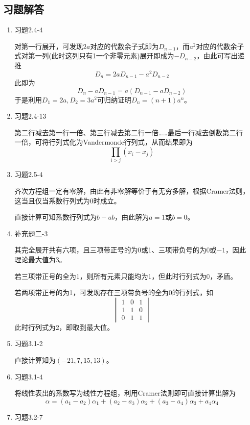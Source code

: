 \documentclass[a4paper,UTF8,fontset=windows]{ctexart}
\begin{document}
\subsection{习题解答}
\begin{enumerate}
    \item 习题2.4-4
    
    对第一行展开，可发现$2a$对应的代数余子式即为$D_{n-1}$，而$a^2$对应的代数余子式对第一列(此时这列只有1一个非零元素)展开即成为$-D_{n-2}$，由此可写出递推
    $$D_n=2aD_{n-1}-a^2D_{n-2}$$
    此即为
    $$D_n-aD_{n-1}=a(D_{n-1}-aD_{n-2})$$
    于是利用$D_1=2a,D_2=3a^2$可归纳证明$D_n=(n+1)a^n$。

    \item 习题2.4-13
    
    第二行减去第一行一倍、第三行减去第二行一倍……最后一行减去倒数第二行一倍，可将行列式化为Vandermonde行列式，从而结果即为
    $$\prod_{i>j}(x_i-x_j)$$

    \item 习题2.5-4
    
    齐次方程组一定有零解，由此有非零解等价于有无穷多解，根据Cramer法则，这当且仅当系数行列式为0时成立。

    直接计算可知系数行列式为$b-ab$，由此解为$a=1$或$b=0$。

    \item 补充题二-3
    
    其完全展开共有六项，且三项带正号的为0或1、三项带负号的为0或$-1$，因此理论最大值为3。

    若三项带正号的全为1，则所有元素只能均为1，但此时行列式为0，矛盾。

    若两项带正号的为1，可发现存在三项带负号的全为0的行列式，如
    $$\begin{vmatrix}1&0&1\\1&1&0\\0&1&1\end{vmatrix}$$
    此时行列式为2，即取到最大值。


    \item 习题3.1-2
    
    直接计算知为$(-21,7,15,13)$。

    \item 习题3.1-4
    
    将线性表出的系数写为线性方程组，利用Cramer法则即可直接计算出解为
    $$\alpha=(a_1-a_2)\alpha_1+(a_2-a_3)\alpha_2+(a_3-a_4)\alpha_3+a_4\alpha_4$$

    \item 习题3.2-7
    

\end{enumerate}
\end{document}
